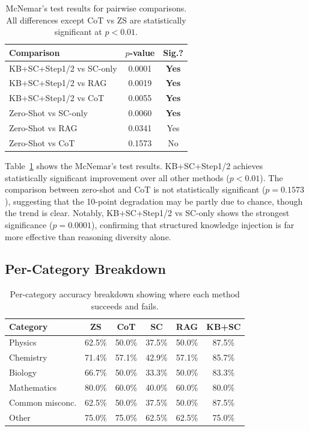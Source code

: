 \begin{table}[htbp]
\centering
\caption{McNemar's test results for pairwise comparisons. All differences except CoT vs ZS are statistically significant at $p < 0.01$.}
\label{tab:significance}
\begin{tabular}{lcc}
\toprule
\textbf{Comparison} & \textbf{$p$-value} & \textbf{Sig.?} \\
\midrule
KB+SC+Step1/2 vs SC-only & 0.0001 & \textbf{Yes} \\
KB+SC+Step1/2 vs RAG & 0.0019 & \textbf{Yes} \\
KB+SC+Step1/2 vs CoT & 0.0055 & \textbf{Yes} \\
Zero-Shot vs SC-only & 0.0060 & \textbf{Yes} \\
Zero-Shot vs RAG & 0.0341 & Yes \\
Zero-Shot vs CoT & 0.1573 & No \\
\bottomrule
\end{tabular}
\end{table}

Table~\ref{tab:significance} shows the McNemar's test results. KB+SC+Step1/2 achieves statistically significant improvement over all other methods ($p < 0.01$). The comparison between zero-shot and CoT is not statistically significant ($p=0.1573$), suggesting that the 10-point degradation may be partly due to chance, though the trend is clear. Notably, KB+SC+Step1/2 vs SC-only shows the strongest significance ($p=0.0001$), confirming that structured knowledge injection is far more effective than reasoning diversity alone.

\subsection{Per-Category Breakdown}

\begin{table}[htbp]
\centering
\caption{Per-category accuracy breakdown showing where each method succeeds and fails.}
\label{tab:category}
\begin{tabular}{lccccc}
\toprule
\textbf{Category} & \textbf{ZS} & \textbf{CoT} & \textbf{SC} & \textbf{RAG} & \textbf{KB+SC} \\
\midrule
Physics & 62.5\% & 50.0\% & 37.5\% & 50.0\% & 87.5\% \\
Chemistry & 71.4\% & 57.1\% & 42.9\% & 57.1\% & 85.7\% \\
Biology & 66.7\% & 50.0\% & 33.3\% & 50.0\% & 83.3\% \\
Mathematics & 80.0\% & 60.0\% & 40.0\% & 60.0\% & 80.0\% \\
Common misconc. & 62.5\% & 50.0\% & 37.5\% & 50.0\% & 87.5\% \\
Other & 75.0\% & 75.0\% & 62.5\% & 62.5\% & 75.0\% \\
\bottomrule
\end{tabular}
\end{table}

